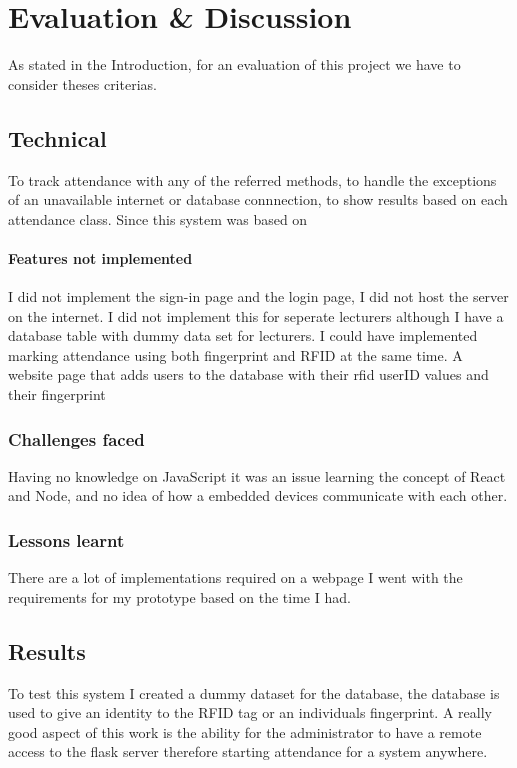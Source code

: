 \chapter{Evaluation \& Discussion}
As stated in the Introduction, for an evaluation of this project we have to consider theses criterias. 

\section{Technical}

To track attendance with any of the referred methods,
to handle the exceptions of an unavailable internet or database connnection, to show results based on each attendance class. 
Since this system was based on 

\subsubsection{Features not implemented}

I did not implement the sign-in page and the login page,
I did not host the server on the internet.
I did not implement this for seperate lecturers although I have a database table with dummy data set for lecturers.
I could have implemented marking attendance using both fingerprint and RFID at the same time. 
A website page that adds users to the database with their rfid userID values and their fingerprint

\subsection{Challenges faced}
Having no knowledge on JavaScript it was an issue learning the concept of React and Node, and no idea of how a embedded devices communicate with each other.

\subsection{Lessons learnt}
There are a lot of implementations required on a webpage I went with the requirements for my prototype based on the time I had. 

\section{Results}
To test this system I created a dummy dataset for the database, the database is used to give an identity to the RFID tag or an individuals fingerprint. 
A really good aspect of this work is the ability for the administrator to have a remote access to the flask server therefore starting attendance for a system anywhere. 

